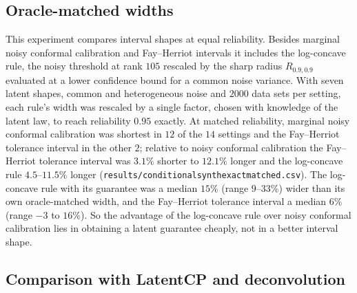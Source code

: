 \documentclass[11pt]{article}
\renewcommand{\_}{\usc\allowbreak}
\begin{document}
\subsection*{Oracle-matched widths}

This experiment compares interval shapes at equal reliability. Besides marginal noisy conformal calibration and Fay--Herriot intervals it includes the log-concave rule, the noisy threshold at rank $105$ rescaled by the sharp radius $R_{0.9,0.9}$ evaluated at a lower confidence bound for a common noise variance. With seven latent shapes, common and heterogeneous noise and $2000$ data sets per setting, each rule's width was rescaled by a single factor, chosen with knowledge of the latent law, to reach reliability $0.95$ exactly. At matched reliability, marginal noisy conformal calibration was shortest in $12$ of the $14$ settings and the Fay--Herriot tolerance interval in the other $2$; relative to noisy conformal calibration the Fay--Herriot tolerance interval was $3.1\%$ shorter to $12.1\%$ longer and the log-concave rule $4.5$--$11.5\%$ longer (\texttt{results/conditional\_synth\_exact\_matched.csv}). The log-concave rule with its guarantee was a median $15\%$ (range $9$--$33\%$) wider than its own oracle-matched width, and the Fay--Herriot tolerance interval a median $6\%$ (range $-3$ to $16\%$). So the advantage of the log-concave rule over noisy conformal calibration lies in obtaining a latent guarantee cheaply, not in a better interval shape.

\subsection*{Comparison with LatentCP and deconvolution}
\end{document}
